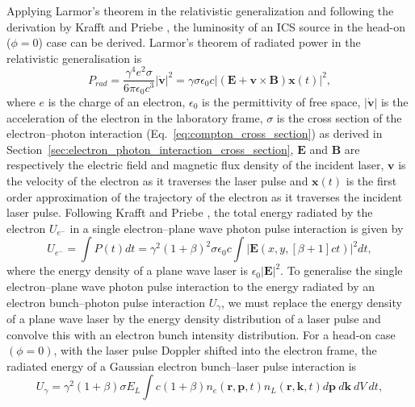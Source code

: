 \documentclass[../main.tex]{subfiles}
\begin{document}
Applying Larmor's theorem \cite{larmor1897lxiii,purcell1965electricity} in the relativistic generalization \cite{jackson1999classical} and following the derivation by Krafft and Priebe \cite{krafft2010compton}, the luminosity of an ICS source in the head-on ($\phi=0$) case can be derived. Larmor's theorem of radiated power in the relativistic generalisation is 
\begin{equation}
P_{rad} = \frac{\gamma^{4}e^{2}\sigma}{6\pi \epsilon_{0}c^{3}}\lvert\dot{\boldsymbol{v}}\rvert^{2} = \gamma\sigma\epsilon_{0}c\lvert\left(\boldsymbol{E}+\boldsymbol{v}\times\boldsymbol{B}\right)\boldsymbol{x}\left(t\right)\rvert^{2},
\label{eq:larmor_formula}    
\end{equation}
where $e$ is the charge of an electron, $\epsilon_{0}$ is the permittivity of free space, $\lvert\dot{\boldsymbol{v}}\rvert$ is the acceleration of the electron in the laboratory frame, $\sigma$ is the cross section of the electron--photon interaction (Eq.~\ref{eq:compton_cross_section}) as derived in Section~\ref{sec:electron_photon_interaction_cross_section}, $\boldsymbol{E}$ and $\boldsymbol{B}$ are respectively the electric field and magnetic flux density of the incident laser, $\boldsymbol{v}$ is the velocity of the electron as it traverses the laser pulse and $\boldsymbol{x}\left(t\right)$ is the first order approximation of the trajectory of the electron as it traverses the incident laser pulse. 
Following Krafft and Priebe \cite{krafft2010compton}, the total energy radiated by the electron $U_{e^{-}}$ in a single electron--plane wave photon pulse interaction is given by 
\begin{equation}
U_{e^{-}} = \int P\left(t\right)dt = \gamma^{2}\left(1+\beta\right)^{2}\sigma\epsilon_{0}c\int\lvert\boldsymbol{E}\left(x,y,\left[\beta+1\right]ct\right)\rvert^{2}dt,
\label{eq:electron_radiated_energy}
\end{equation}
where the energy density of a plane wave laser is $\epsilon_{0}\lvert\boldsymbol{E}\rvert^{2}$. To generalise the single electron--plane wave photon pulse interaction to the energy radiated by an electron bunch--photon pulse interaction $U_{\gamma}$, we must replace the energy density of a plane wave laser by the energy density distribution of a laser pulse and convolve this with an electron bunch intensity distribution. For a head-on case $\left(\phi=0\right)$, with the laser pulse Doppler shifted into the electron frame, the radiated energy of a Gaussian electron bunch--laser pulse interaction is    
\begin{equation}
U_{\gamma} = \gamma^{2}\left(1+\beta\right)\sigma E_{L}\int c\left(1+\beta\right) n_{e}\left(\boldsymbol{r},\boldsymbol{p},t\right)n_{L}\left(\boldsymbol{r},\boldsymbol{k},t\right) d\boldsymbol{p}~d\boldsymbol{k}~dV~dt,
\label{eq:total_interaction_energy}
\end{equation}
\end{document}
